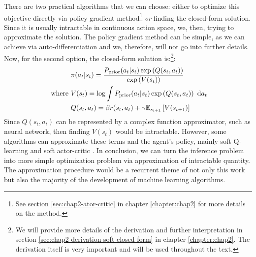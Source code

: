 There are two practical algorithms that we can choose: either to optimize this objective directly via policy gradient method\footnote{See section \ref{sec:chap2-ator-critic} in chapter \ref{chapter:chap2} for more details on the method.} \textit{or} finding the closed-form solution. Since it is usually intractable in continuous action space, we, then, trying to approximate the solution. The policy gradient method can be simple, as we can achieve via auto-differentiation and we, therefore, will not go into further details. Now, for the second option, the closed-form solution is:\footnote{We will provide more details of the derivation and further interpretation in section \ref{sec:chap2-derivation-soft-closed-form} in chapter \ref{chapter:chap2}. The derivation itself is very important and will be used throughout the text.}:
\begin{equation}
\begin{aligned}
    &\pi(a_t | s_t) = \frac{P_{\text{prior}}(a_t | s_t) \exp\left( Q(s_t, a_t) \right)}{\exp\left( V(s_t) \right)} \\
    \text{ where }& V(s_t) = \log \int P_{\text{prior}}(a_t | s_t) \exp\left( Q(s_t, a_t) \right) \ \mathrm{d} a_t \\
    &Q(s_t, a_t) = \beta r(s_t, a_t) + \gamma\mathbb{E}_{s_{t+1}}\left[ V(s_{t+1}) \right]
\end{aligned}
\end{equation}
Since $Q(s_t, a_t)$ can be represented by a complex function approximator, such as neural network, then finding $V(s_t)$ would be intractable. However, some algorithms can approximate these terms and the agent's policy, mainly soft Q-learning \cite{haarnoja2017reinforcement} and soft actor-critic \cite{haarnoja2018softa, haarnoja2018softb}. In conclusion, we can turn the inference problem into more simple optimization problem via approximation of intractable quantity. The approximation procedure would be a recurrent theme of not only this work but also the majority of the development of machine learning algorithms.  

